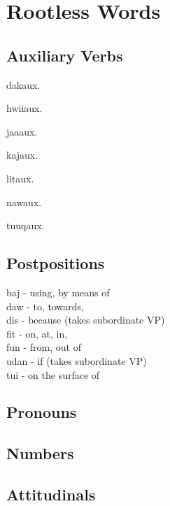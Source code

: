 \chapter{Rootless Words}
\begin{multicols*}{2}
\section{Auxiliary Verbs}
\begin{description}[leftmargin=*]
    \begin{dictentry}{dak}{aux.}
    \end{dictentry}
    \begin{dictentry}{hwii}{aux.}
    \end{dictentry}
    \begin{dictentry}{jaa}{aux.}
    \end{dictentry}
    \begin{dictentry}{kaj}{aux.}
    \end{dictentry}
    \begin{dictentry}{lit}{aux.}
    \end{dictentry}
    \begin{dictentry}{naw}{aux.}
    \end{dictentry}
    \begin{dictentry}{tuuq}{aux.}
    \end{dictentry}
\end{description}

\section{Postpositions}

baj - using, by means of\\
daw - to, towards,\\
dis - because (takes subordinate VP)\\
fit - on, at, in,\\
fun - from, out of\\
udan - if (takes subordinate VP)\\
tui - on the surface of\\

\section{Pronouns}

\section{Numbers}

\section{Attitudinals}

\end{multicols*}